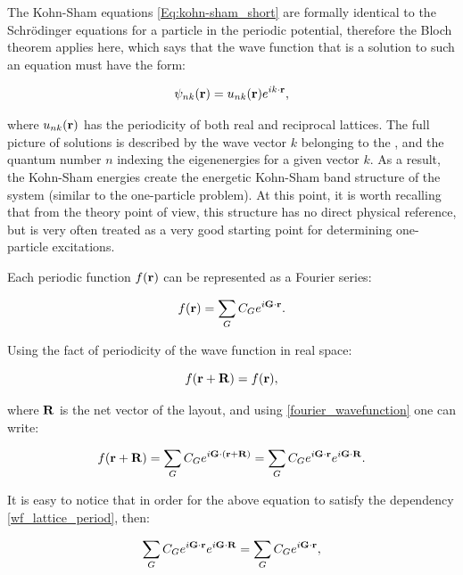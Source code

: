 The Kohn-Sham equations \ref{Eq:kohn-sham_short} are formally identical to the Schr\"odinger equations for a particle in the periodic potential, therefore the Bloch theorem applies here, which says that the wave function that is a solution to such an equation must have the form:

\begin{equation}
    \psi_{nk}(\mathbf{r})=u_{nk}(\mathbf{r})e^{ik\cdot\mathbf{r}},
    \label{bloch_theorem}
\end{equation}

where $u_{nk}(\mathbf{r})$ has the periodicity of both real and reciprocal lattices.
The full picture of solutions is described by the wave vector $k$ belonging to the \BZ, and the quantum number $n$ indexing the eigenenergies for a given vector $k$.
As a result, the Kohn-Sham energies create the energetic Kohn-Sham band structure of the system (similar to the one-particle problem).
At this point, it is worth recalling that from the theory point of view, this structure has no direct physical reference, but is very often treated as a very good starting point for determining one-particle excitations.

Each periodic function $f(\mathbf{r})$ can be represented as a Fourier series:

\begin{equation}
    f(\mathbf{r})=\sum_GC_{G}e^{i\mathbf{G}\cdot\mathbf{r}}.
    \label{fourier_wavefunction}
\end{equation}

Using the fact of periodicity of the wave function in real space:

\begin{equation}
    f(\mathbf{r}+\mathbf{R})=f(\mathbf{r}),
    \label{wf_lattice_period}
\end{equation}

where $\mathbf{R}$ is the net vector of the layout, and using \ref{fourier_wavefunction} one can write:

\begin{equation}
    f(\mathbf{r}+\mathbf{R})=\sum_GC_Ge^{i\mathbf{G}\cdot(\mathbf{r}+\mathbf{R})}=\sum_GC_Ge^{i\mathbf{G}\cdot\mathbf{r}}e^{i\mathbf{G}\cdot\mathbf{R}}.
    \label{fourier_wavefunction2}
\end{equation}

It is easy to notice that in order for the above equation to satisfy the dependency \ref{wf_lattice_period}, then:

\begin{equation}
    \sum_GC_Ge^{i\mathbf{G}\cdot\mathbf{r}}e^{i\mathbf{G}\cdot\mathbf{R}}=\sum_GC_Ge^{i\mathbf{G}\cdot\mathbf{r}},
    \label{fourier_wavefunction3}
\end{equation}

